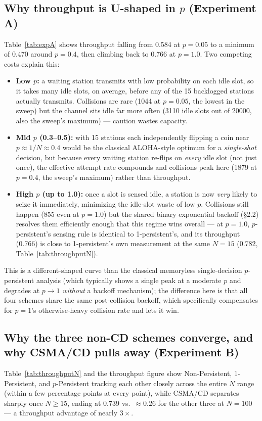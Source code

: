 \documentclass[11pt]{article}
\begin{document}
\subsection{Why throughput is U-shaped in $p$ (Experiment A)}
Table~\ref{tab:expA} shows throughput falling from 0.584 at $p{=}0.05$ to a minimum of
0.470 around $p{=}0.4$, then climbing back to 0.766 at $p{=}1.0$. Two competing costs
explain this:
\begin{itemize}[leftmargin=1.6em]
  \item \textbf{Low $p$:} a waiting station transmits with low probability on each idle
  slot, so it takes many idle slots, on average, before any of the 15 backlogged stations
  actually transmits. Collisions are rare (1044 at $p{=}0.05$, the lowest in the sweep) but
  the channel sits idle far more often (3110 idle slots out of 20000, also the sweep's
  maximum) --- caution wastes capacity.
  \item \textbf{Mid $p$ (0.3--0.5):} with 15 stations each independently flipping a coin
  near $p\approx1/N \approx 0.4$ would be the classical ALOHA-style optimum for a
  \emph{single-shot} decision, but because every waiting station re-flips on \emph{every}
  idle slot (not just once), the effective attempt rate compounds and collisions peak here
  (1879 at $p{=}0.4$, the sweep's maximum) rather than throughput.
  \item \textbf{High $p$ (up to 1.0):} once a slot is sensed idle, a station is now
  \emph{very} likely to seize it immediately, minimizing the idle-slot waste of low $p$.
  Collisions still happen (855 even at $p{=}1.0$) but the shared binary exponential backoff
  (\S2.2) resolves them efficiently enough that this regime wins overall --- at $p{=}1.0$,
  $p$-persistent's sensing rule is identical to 1-persistent's, and its throughput (0.766)
  is close to 1-persistent's own measurement at the same $N=15$ (0.782, Table~\ref{tab:throughputN}).
\end{itemize}
This is a different-shaped curve than the classical memoryless single-decision $p$-persistent
analysis (which typically shows a single peak at a moderate $p$ and degrades at $p\to1$
\emph{without} a backoff mechanism); the difference here is that all four schemes share the
same post-collision backoff, which specifically compensates for $p{=}1$'s otherwise-heavy
collision rate and lets it win.

\subsection{Why the three non-CD schemes converge, and why CSMA/CD pulls away (Experiment B)}
Table~\ref{tab:throughputN} and the throughput figure show Non-Persistent, 1-Persistent, and
$p$-Persistent tracking each other closely across the entire $N$ range (within a few
percentage points at every point), while CSMA/CD separates sharply once $N \ge 15$, ending at
0.739 vs.\ $\approx 0.26$ for the other three at $N=100$ --- a throughput advantage of
nearly $3\times$.
\end{document}
